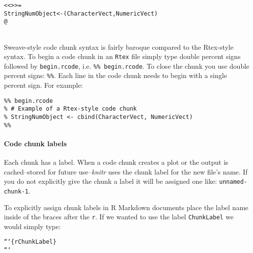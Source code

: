\begin{knitrout}
    \color{fgcolor}\begin{kframe}
        \begin{alltt}
\textless\textless \textgreater\textgreater=
StringNumObject <- (CharacterVect, NumericVect)
@
        \end{alltt}
    \end{kframe}
\end{knitrout}

 \\[0.25cm]

Sweave-style code chunk syntax is fairly baroque compared to the Rtex-style syntax. To begin a code chunk in an \texttt{Rtex} file simply type double percent signs followed by \texttt{begin.rcode}, i.e. \texttt{\%\% begin.rcode}. To close the chunk you use double percent signs: \texttt{\%\%}. Each line in the code chunk needs to begin with a single percent sign. For example:

\begin{knitrout}
    \color{fgcolor}
    \begin{kframe}
        \begin{verbatim}
%% begin.rcode
% # Example of a Rtex-style code chunk
% StringNumObject <- cbind(CharacterVect, NumericVect)
%%
            \end{verbatim}
        \end{kframe}
\end{knitrout}

\paragraph{Code chunk labels}

Each chunk has a label. When a code chunk creates a plot or the output is cached--stored for future use--{\emph{knitr}} uses the chunk label for the new file's name. If you do not explicitly give the chunk a label it will be assigned one like: \texttt{unnamed-chunk-1}.

To explicitly assign chunk labels in R Markdown documents place the label name inside of the braces after the \texttt{r}. If we wanted to use the label \texttt{ChunkLabel} we would simply type:

\begin{knitrout}
\color{fgcolor}\begin{kframe}
\begin{alltt}
```\{r ChunkLabel\}
```
\end{alltt}
\end{kframe}
\end{knitrout}


